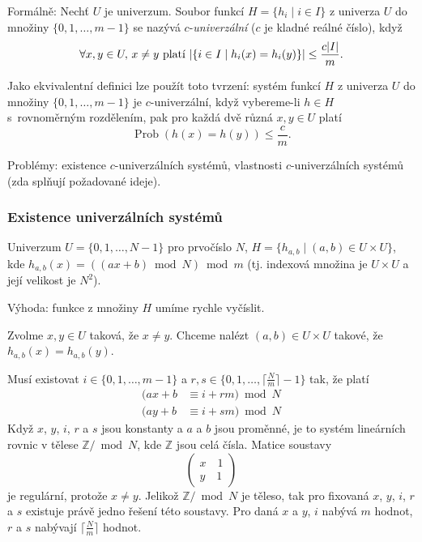 \documentclass[a4paper,12pt]{article}
\DeclareMathOperator*{\Prob}{Prob}
\begin{document}
Formálně: Nechť  $U$ je univerzum. Soubor  
funkcí $H=\{h_i\mid i\in I\}$ z univerza $U$ do množiny $\{
0,1,\dots,m-1\}$ se 
nazývá $c$-\emph{univerzální} ($c$ je kladné reálné číslo), 
když 
$$\forall x,y\in U,\,x\ne y\text{\rm\ platí }|\{i\in I\mid h_
i(x)=h_i(y)\}|\le\frac {c|I|}m.$$

Jako ekvivalentní definici lze použít toto tvrzení: systém funkcí $
H$ z univerza $U$ do množiny $\{0,1,\dots,m-1\}$ je $c$-univerzální,
když vybereme-li $h\in H$ s~rovnoměrným rozděle\-ním, pak pro 
každá dvě různá $x,y\in U$ platí 
$$\Prob(h(x)=h(y))\le\frac cm.$$

Problémy: existence $c$-univerzálních 
systémů, \newline 
vlastnosti $c$-univerzálních systémů (zda splňují 
požadované ide\-je).

\subsubsection{Existence univerzálních systémů}

Univerzum $U=\{0,1,\dots,N-1\}$ pro prvočíslo $N$,\newline 
$H=\{h_{a,b}\mid (a,b)\in U\times U\}$,\newline 
kde $h_{a,b}(x)=((ax+b)\bmod N)\bmod m$\newline 
(tj. indexová množina je $U\times U$ a její velikost je $
N^2$).

Výhoda: funkce z množiny $H$ umíme rychle 
vyčíslit.

Zvolme $x,y\in U$ taková, že $x\ne y$. Chceme nalézt 
$(a,b)\in U\times U$ takové, že $h_{a,b}(x)=h_{a,b}(y)$. 

Musí existovat $i\in \{0,1,\dots,m-1\}$ a 
$r,s\in \{0,1,\dots,\lceil\frac Nm\rceil -1\}$ tak, že platí
\begin{align*}(ax+b&\equiv i+rm)\bmod N\\
(ay+b&\equiv i+sm)\bmod N\end{align*}
Když $x$, $y$, $i$, $r$ a $s$ jsou konstanty a $a$ a $b$ jsou 
proměnné, je to systém lineárních rovnic v tělese 
$\mathbb Z/\bmod N$, kde $\mathbb Z$ jsou celá čísla. Matice soustavy  
$$\begin{pmatrix} x\quad 1\\
y\quad 1\end{pmatrix} $$
je regulární, protože $x\ne y$. Jelikož $\mathbb Z/\bmod N$ je těleso, tak 
 pro fixovaná $x$, $y$, $i$, $r$ a $s$ existuje právě jedno řešení této soustavy.
Pro daná $x$ a $y$, $i$ nabývá $m$ hodnot, $r$ a $s$ nabývají 
$\lceil\frac Nm\rceil$ hodnot. 
\end{document}
